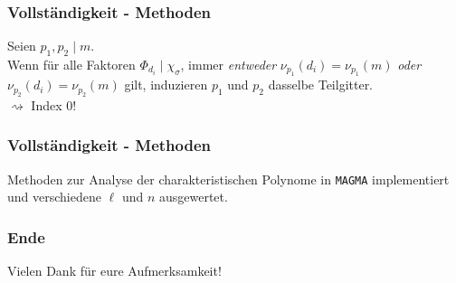 \documentclass{beamer}
\begin{document}
\begin{frame}[plain]
	\frametitle{Vollständigkeit - Methoden}
	Seien $p_1, p_2 \mid m$.\\
	Wenn für alle Faktoren $\Phi_{d_i} \mid \chi_\sigma$, immer \textit{entweder} $\nu_{p_1}(d_i) = \nu_{p_1}(m)$ \textit{oder} $\nu_{p_2}(d_i) = \nu_{p_2}(m)$ gilt, induzieren $p_1$ und $p_2$ dasselbe Teilgitter.\\
	\pause
	$\rightsquigarrow$ Index $0$!
\end{frame}

\begin{frame}[plain]
	\frametitle{Vollständigkeit - Methoden}
	Methoden zur Analyse der charakteristischen Polynome in \texttt{MAGMA} implementiert und verschiedene $\ell$ und $n$ ausgewertet.\\
\end{frame}

\begin{frame}[plain]
	\frametitle{Ende}
	\begin{large} \begin{center} Vielen Dank für eure Aufmerksamkeit! \end{center} \end{large}
\end{frame}
\end{document}
